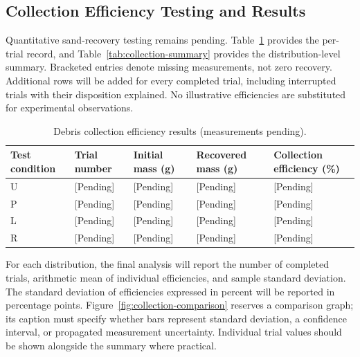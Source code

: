 \subsection{Collection Efficiency Testing and Results}
\label{sec:collection-results}
Quantitative sand-recovery testing remains pending. Table~\ref{tab:collection-trials} provides the per-trial record, and Table~\ref{tab:collection-summary} provides the distribution-level summary. Bracketed entries denote missing measurements, not zero recovery. Additional rows will be added for every completed trial, including interrupted trials with their disposition explained. No illustrative efficiencies are substituted for experimental observations.

\begin{table}[htbp]\centering
\caption{Debris collection efficiency results (measurements pending).}
\label{tab:collection-trials}
\begingroup\small\singlespacing\renewcommand{\arraystretch}{1.2}
\begin{tabularx}{\textwidth}{@{}XXXXX@{}}\toprule
Test condition & Trial number & Initial mass (g) & Recovered mass (g) & Collection efficiency (\%) \\\midrule
U & [Pending] & [Pending] & [Pending] & [Pending] \\
P & [Pending] & [Pending] & [Pending] & [Pending] \\
L & [Pending] & [Pending] & [Pending] & [Pending] \\
R & [Pending] & [Pending] & [Pending] & [Pending] \\
\bottomrule\end{tabularx}\endgroup
\end{table}

For each distribution, the final analysis will report the number of completed trials, arithmetic mean of individual efficiencies, and sample standard deviation. The standard deviation of efficiencies expressed in percent will be reported in percentage points. Figure~\ref{fig:collection-comparison} reserves a comparison graph; its caption must specify whether bars represent standard deviation, a confidence interval, or propagated measurement uncertainty. Individual trial values should be shown alongside the summary where practical.

